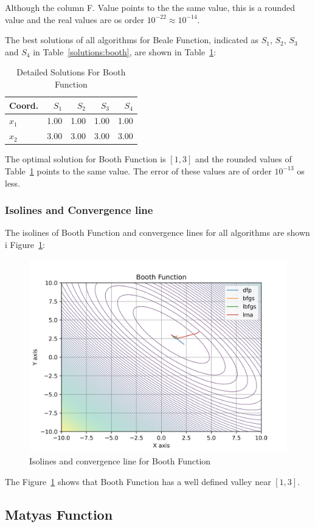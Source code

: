 \documentclass[conference]{IEEEtran}
\begin{document}
Although the column F. Value points to the the same value, this is a rounded value
and the real values are os order $10^{-22} \approx 10^{-14}$.


The best solutions of all algorithms for Beale Function, indicated as
$S_{1}$, $S_{2}$, $S_{3}$ and $S_{4}$ in Table~\ref{solutions:booth}, are shown
in Table~\ref{detailedsolutions:booth}:

\begin{table}[H]
\centering
\caption{Detailed Solutions For Booth Function}
\label{detailedsolutions:booth}
\begin{tabular}{lrrrr}
\toprule
 Coord. &  $S_{1}$ &  $S_{2}$ &  $S_{3}$ &  $S_{4}$ \\
\midrule
$x_{1}$ &     1.00 &     1.00 &     1.00 &     1.00 \\
$x_{2}$ &     3.00 &     3.00 &     3.00 &     3.00 \\
\bottomrule
\end{tabular}
\end{table}

The optimal solution for Booth Function is $\left[1, 3\right]$ and the rounded values
of Table~\ref{detailedsolutions:booth} points to the same value. The error of
these values are of order $10^{-13}$ os less.
\subsubsection{Isolines and Convergence line}
\label{isolinesbooth2D}

The isolines of Booth Function and convergence lines for all algorithms are shown i Figure~\ref{fig:booth}:\begin{figure}[H]
\centering
\caption{Isolines and convergence line for Booth Function}
\label{fig:booth}
\includegraphics[scale=0.5]{images/booth.jpg}
\end{figure}
The Figure~\ref{fig:booth} shows that Booth Function has a well defined valley near $[1, 3]$. \subsection{Matyas Function}
\label{matyas2D}
\end{document}
